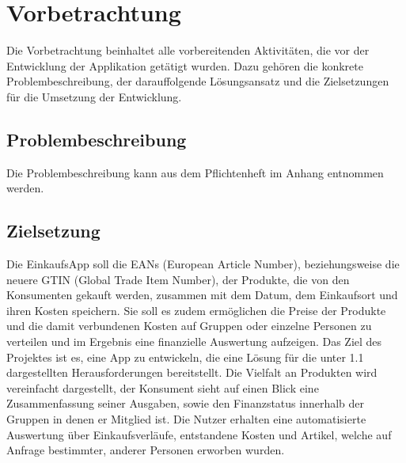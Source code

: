 \documentclass[12pt,a4paper]{article}
\begin{document}
\newpage
\section{Vorbetrachtung}
Die Vorbetrachtung beinhaltet alle vorbereitenden Aktivitäten, die vor der Entwicklung der Applikation getätigt wurden. Dazu gehören die konkrete Problembeschreibung, der darauffolgende Lösungsansatz und die Zielsetzungen für die Umsetzung der Entwicklung.


\subsection{Problembeschreibung}

Die Problembeschreibung kann aus dem Pflichtenheft im Anhang entnommen werden.


\subsection{Zielsetzung}
Die EinkaufsApp soll die EANs (European Article Number), beziehungsweise die neuere GTIN (Global Trade Item Number), der Produkte, die von den Konsumenten gekauft werden, zusammen mit dem Datum, dem Einkaufsort und ihren Kosten speichern.
Sie soll es zudem ermöglichen die Preise der Produkte und die damit verbundenen Kosten auf Gruppen oder einzelne Personen zu verteilen und im Ergebnis eine finanzielle Auswertung aufzeigen.
Das Ziel des Projektes ist es, eine App zu entwickeln, die eine Lösung für die unter 1.1 dargestellten Herausforderungen bereitstellt. 
Die Vielfalt an Produkten wird vereinfacht dargestellt, der Konsument sieht auf einen Blick eine Zusammenfassung seiner Ausgaben, sowie den Finanzstatus innerhalb der Gruppen in denen er Mitglied ist. Die Nutzer erhalten eine automatisierte Auswertung über Einkaufsverläufe, entstandene Kosten und Artikel, welche auf Anfrage bestimmter, anderer Personen erworben wurden.
\end{document}
